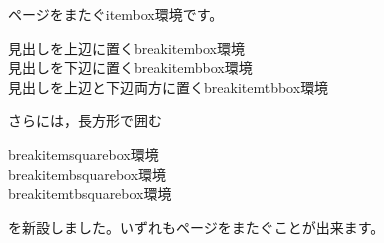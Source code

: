 \documentclass{jarticle}
\begin{document}
ページをまたぐ\textsf{itembox}環境です。

\begin{jquote}
見出しを上辺に置く\textsf{breakitembox}環境\\
見出しを下辺に置く\textsf{breakitembbox}環境\\
見出しを上辺と下辺両方に置く\textsf{breakitemtbbox}環境\\
\end{jquote}
さらには，長方形で囲む
\begin{jquote}
\textsf{breakitemsquarebox}環境\\
\textsf{breakitembsquarebox}環境\\
\textsf{breakitemtbsquarebox}環境
\end{jquote}
を新設しました。いずれもページをまたぐことが出来ます。

\zw\relax
\def\breakboxparindent{1\zw}%
\end{document}
